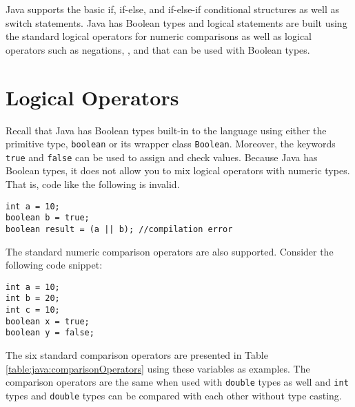 

Java supports the basic if, if-else, and if-else-if conditional structures as well as switch
statements.  Java has Boolean types and logical statements are built using the standard 
logical operators for numeric comparisons as well as logical operators such as negations, 
\And, and \Or that can be used with Boolean types.

\section{Logical Operators}

Recall that Java has Boolean types built-in to the language using
either the primitive type, \texttt{boolean} or its wrapper class
\texttt{Boolean}.  Moreover, the keywords \texttt{true}
and \texttt{false} can be used to assign and check values.
Because Java has Boolean types, it does not allow you to mix logical operators
with numeric types.  That is, code like the following is invalid.

\begin{verbatim}
int a = 10;
boolean b = true;
boolean result = (a || b); //compilation error
\end{verbatim}

The standard numeric comparison operators are also supported.  Consider the 
following code snippet:

\begin{verbatim}
int a = 10;
int b = 20;
int c = 10;
boolean x = true;
boolean y = false;
\end{verbatim}

The six standard comparison operators are presented in Table \ref{table:java:comparisonOperators}
using these variables as examples.  The comparison operators are the same when
used with \texttt{double} types as well and \texttt{int} types and 
\texttt{double} types can be compared with each other without type casting.

